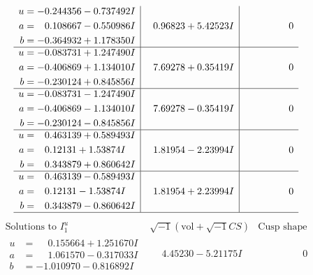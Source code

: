 \documentclass[1p]{elsarticle_modified}
\theoremstyle{definition}
\newcommand{\I}{\sqrt{-1}}
\begin{document}
$$\begin{array}{c|c|c}
\begin{aligned}
u &= -0.244356 - 0.737492 I \\
a &= \phantom{-}0.108667 - 0.550986 I \\
b &= -0.364932 + 1.178350 I\end{aligned}
 & \phantom{-}0.96823 + 5.42523 I & \phantom{-0.000000 } 0 \\ \hline\begin{aligned}
u &= -0.083731 + 1.247490 I \\
a &= -0.406869 + 1.134010 I \\
b &= -0.230124 + 0.845856 I\end{aligned}
 & \phantom{-}7.69278 + 0.35419 I & \phantom{-0.000000 } 0 \\ \hline\begin{aligned}
u &= -0.083731 - 1.247490 I \\
a &= -0.406869 - 1.134010 I \\
b &= -0.230124 - 0.845856 I\end{aligned}
 & \phantom{-}7.69278 - 0.35419 I & \phantom{-0.000000 } 0 \\ \hline\begin{aligned}
u &= \phantom{-}0.463139 + 0.589493 I \\
a &= \phantom{-}0.12131 + 1.53874 I \\
b &= \phantom{-}0.343879 + 0.860642 I\end{aligned}
 & \phantom{-}1.81954 - 2.23994 I & \phantom{-0.000000 } 0 \\ \hline\begin{aligned}
u &= \phantom{-}0.463139 - 0.589493 I \\
a &= \phantom{-}0.12131 - 1.53874 I \\
b &= \phantom{-}0.343879 - 0.860642 I\end{aligned}
 & \phantom{-}1.81954 + 2.23994 I & \phantom{-0.000000 } 0\\
 \hline 
 \end{array}$$\newpage$$\begin{array}{c|c|c}  
\text{Solutions to }I^u_{1}& \I (\text{vol} + \sqrt{-1}CS) & \text{Cusp shape}\\
 \hline 
\begin{aligned}
u &= \phantom{-}0.155664 + 1.251670 I \\
a &= \phantom{-}1.061570 - 0.317033 I \\
b &= -1.010970 - 0.816892 I\end{aligned}
 & \phantom{-}4.45230 - 5.21175 I & \phantom{-0.000000 } 0 \\ \hline\begin{aligned}

\end{aligned}
\end{array}$$
\end{document}
